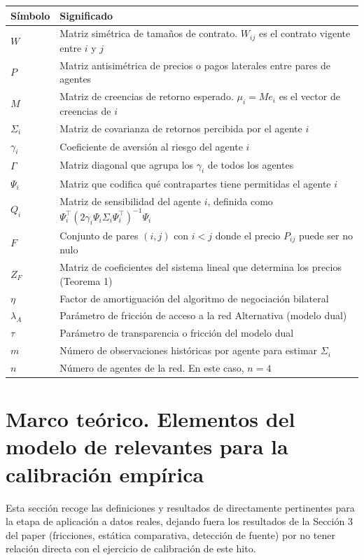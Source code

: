\begin{center}
\begin{tabular}{ll}
\hline
Símbolo & Significado \\
\hline
$W$ & Matriz simétrica de tamaños de contrato. $W_{ij}$ es el contrato vigente entre $i$ y $j$ \\
$P$ & Matriz antisimétrica de precios o pagos laterales entre pares de agentes \\
$M$ & Matriz de creencias de retorno esperado. $\mu_i = Me_i$ es el vector de creencias de $i$ \\
$\Sigma_i$ & Matriz de covarianza de retornos percibida por el agente $i$ \\
$\gamma_i$ & Coeficiente de aversión al riesgo del agente $i$ \\
$\Gamma$ & Matriz diagonal que agrupa los $\gamma_i$ de todos los agentes \\
$\Psi_i$ & Matriz que codifica qué contrapartes tiene permitidas el agente $i$ \\
$Q_i$ & Matriz de sensibilidad del agente $i$, definida como $\Psi_i^\top(2\gamma_i \Psi_i \Sigma_i \Psi_i^\top)^{-1}\Psi_i$ \\
$F$ & Conjunto de pares $(i,j)$ con $i<j$ donde el precio $P_{ij}$ puede ser no nulo \\
$Z_F$ & Matriz de coeficientes del sistema lineal que determina los precios (Teorema 1) \\
$\eta$ & Factor de amortiguación del algoritmo de negociación bilateral \\
$\lambda_A$ & Parámetro de fricción de acceso a la red Alternativa (modelo dual) \\
$\tau$ & Parámetro de transparencia o fricción del modelo dual \\
$m$ & Número de observaciones históricas por agente para estimar $\Sigma_i$ \\
$n$ & Número de agentes de la red. En este caso, $n=4$ \\
\hline
\end{tabular}
\end{center}

\section[Marco teórico. Elementos del modelo de Jalan y Chakrabarti]{Marco teórico. Elementos del modelo de  relevantes para la calibración empírica}

Esta sección recoge las definiciones y resultados de  directamente pertinentes para la etapa de aplicación a datos reales, dejando fuera los resultados de la Sección 3 del paper (fricciones, estática comparativa, detección de fuente) por no tener relación directa con el ejercicio de calibración de este hito.

